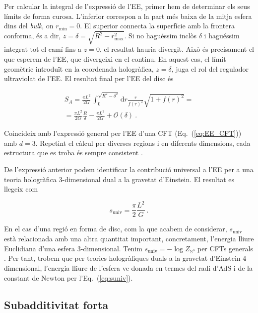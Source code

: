\documentclass[twocolumn]{revtex4}
\providecommand{\eq}[2]{
    \begin{equation}
        #2
    \label{eq:#1}
    \end{equation}
}
\providecommand{\eqgat}[2]{
    \begin{gather}
        #2
    \label{eq:#1}
    \end{gather}
}
\begin{document}
Per calcular la integral de l'expressió de l'EE, primer hem de determinar els seus límits de forma curosa. L'inferior correspon a la part més baixa de la mitja esfera dins del \emph{bulk}, on $r_\text{min}=0$. El superior connecta la superfície amb la frontera conforma, és a dir, $z=\delta=\sqrt{R^2-r_\text{max}^2}$. Si no haguéssim inclòs $\delta$ i haguéssim integrat tot el camí fins a $z=0$, el resultat hauria divergit. Això és precisament el que esperem de l'EE, que divergeixi en el continu. En aquest cas, el límit geomètric introduït en la coordenada hologràfica, $z=\delta$, juga el rol del regulador ultraviolat de l'EE. El resultat final per l'EE del disc és
\eqgat{1sol}{
S_A = \frac{\pi L^2}{2G} \, \int_0^{\sqrt{R^2-\delta^2}} \mathrm{d}r \frac{r}{f(r)^2} \sqrt{ 1 + \dot{f}(r)^2 } = \nonumber \\
= \frac{\pi L^2}{2G} \frac{R}{\delta} - \frac{\pi L^2}{2G}+\mathcal{O}(\delta) \ . \nonumber
}
Coincideix amb l'expressió general per l'EE d'una CFT (Eq.~(\ref{eq:EE_CFT})) amb $d=3$. Repetint el càlcul per diverses regions i en diferents dimensions, cada estructura que es troba és sempre consistent \cite{ryu_aspects_2006,ryu_holographic_2008}.

De l'expressió anterior podem identificar la contribució universal a l'EE per a una teoria hologràfica 3-dimensional dual a la gravetat d'Einstein. El resultat es llegeix com
\eq{suniv}{
s_\text{univ} = \frac{\pi}{2} \frac{L^2}{G} \ .
}
En el cas d'una regió en forma de disc, com la que acabem de considerar, $s_\text{univ}$ està relacionada amb una altra quantitat important, concretament, l'energia lliure Euclidiana d'una esfera 3-dimensional. Tenim $s_\text{univ}= -\log Z_{\mathbb{S}^3}$ per CFTs generals \cite{casini_towards_2011}. Per tant, trobem que per teories hologràfiques duals a la gravetat d'Einstein 4-dimensional, l'energia lliure de l'esfera ve donada en termes del radi d'AdS i de la constant de Newton per l'Eq.~(\ref{eq:suniv}).


\subsection{Subadditivitat forta} \label{ss:SS}
\end{document}
